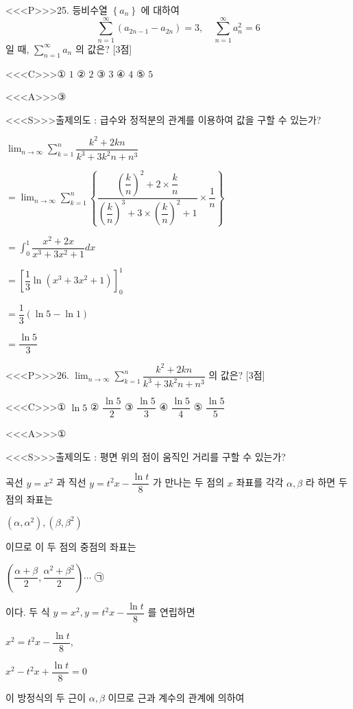\documentclass{oblivoir}
\begin{document}
<<<P>>>25. 등비수열 $\left\{a_{n}\right\}$ 에 대하여
$$
\displaystyle\sum_{n=1}^{\infty}\left(a_{2 n-1}-a_{2 n}\right)=3, \quad \displaystyle\sum_{n=1}^{\infty} a_{n}^{2}=6
$$
일 때, $\displaystyle\sum_{n=1}^{\infty} a_{n}$ 의 값은? [3점]

<<<C>>>① $1$
② $2$
③ $3$
④ $4$
⑤ $5$


<<<A>>>③

<<<S>>>출제의도 : 급수와 정적분의 관계를 이용하여 값을 구할 수 있는가?

$\displaystyle\lim _{n \rightarrow \infty} \displaystyle\sum_{k=1}^{n} \dfrac{k^{2}+2 k n}{k^{3}+3 k^{2} n+n^{3}}$

$=\displaystyle\lim _{n \rightarrow \infty} \displaystyle\sum_{k=1}^{n}\left\{\dfrac{\left(\dfrac{k}{n}\right)^{2}+2 \times \dfrac{k}{n}}{\left(\dfrac{k}{n}\right)^{3}+3 \times\left(\dfrac{k}{n}\right)^{2}+1} \times \dfrac{1}{n}\right\}$

$=\displaystyle\int_{0}^{1} \dfrac{x^{2}+2 x}{x^{3}+3 x^{2}+1} d x$

$=\left[\dfrac{1}{3} \ln \left(x^{3}+3 x^{2}+1\right)\right]_{0}^{1}$

$=\dfrac{1}{3}(\ln 5-\ln 1)$

$=\dfrac{\ln 5}{3}$


<<<P>>>26. $\displaystyle\lim _{n \rightarrow \infty} \displaystyle\sum_{k=1}^{n} \dfrac{k^{2}+2 k n}{k^{3}+3 k^{2} n+n^{3}}$ 의 값은? [3점]

<<<C>>>① $\ln 5$
② $\dfrac{\ln 5}{2}$
③ $\dfrac{\ln 5}{3}$
④ $\dfrac{\ln 5}{4}$
⑤ $\dfrac{\ln 5}{5}$


<<<A>>>①

<<<S>>>출제의도 : 평면 위의 점이 움직인 거리를 구할 수 있는가?

곡선 $y=x^{2}$ 과 직선 $y=t^{2} x-\dfrac{\ln t}{8}$ 가 만나는 두 점의 $x$ 좌표를 각각 $\alpha, \beta$ 라 하면 두 점의 좌표는

$\left(\alpha, \alpha^{2}\right),\left(\beta, \beta^{2}\right)$

이므로 이 두 점의 중점의 좌표는

$\left(\dfrac{\alpha+\beta}{2}, \dfrac{\alpha^{2}+\beta^{2}}{2}\right) \cdots$ ㉠

이다. 두 식 $y=x^{2}, y=t^{2} x-\dfrac{\ln t}{8}$ 를 연립하면

$x^{2}=t^{2} x-\dfrac{\ln t}{8}$,

$x^{2}-t^{2} x+\dfrac{\ln t}{8}=0$

이 방정식의 두 근이 $\alpha, \beta$ 이므로 근과 계수의 관계에 의하여
\end{document}
